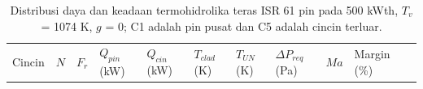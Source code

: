 \documentclass[
  indonesian,
  12pt,
  a4paper,
]{report}
\begin{document}
\begin{longtable}[]{@{}
  >{\raggedright\arraybackslash}p{}
  >{\centering\arraybackslash}p{}
  >{\centering\arraybackslash}p{}
  >{\centering\arraybackslash}p{}
  >{\centering\arraybackslash}p{}
  >{\centering\arraybackslash}p{}
  >{\centering\arraybackslash}p{}
  >{\centering\arraybackslash}p{}
  >{\centering\arraybackslash}p{}
  >{\centering\arraybackslash}p{}
  >{\centering\arraybackslash}p{}@{}}
\caption{Distribusi daya dan keadaan termohidrolika teras ISR 61 pin
pada 500 kWth, \(T_v\) = 1074 K, \(g\) = 0; C1 adalah pin pusat dan C5
adalah cincin terluar.}\label{tbl-teras}\tabularnewline
\toprule\noalign{}
\begin{minipage}[b]{\linewidth}\raggedright
Cincin
\end{minipage} & \begin{minipage}[b]{\linewidth}\centering
\(N\)
\end{minipage} & \begin{minipage}[b]{\linewidth}\centering
\(F_r\)
\end{minipage} & \begin{minipage}[b]{\linewidth}\centering
\(Q_{pin}\) (kW)
\end{minipage} & \begin{minipage}[b]{\linewidth}\centering
\(Q_{cin}\) (kW)
\end{minipage} & \begin{minipage}[b]{\linewidth}\centering
\(T_{clad}\) (K)
\end{minipage} & \begin{minipage}[b]{\linewidth}\centering
\(T_{UN}\) (K)
\end{minipage} & \begin{minipage}[b]{\linewidth}\centering
\(\Delta P_{req}\) (Pa)
\end{minipage} & \begin{minipage}[b]{\linewidth}\centering
\(Ma\)
\end{minipage} & \begin{minipage}[b]{\linewidth}\centering
Margin (\%)
\end{minipage} & \begin{minipage}[b]{\linewidth}\centering

\end{minipage}
\end{longtable}
\end{document}
